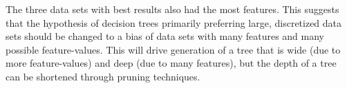 The three data sets with best results also had the most features.
This suggests that the hypothesis of decision trees primarily preferring large, discretized data sets should be changed to a bias of data sets with many features and many possible feature-values.
This will drive generation of a tree that is wide (due to more feature-values) and deep (due to many features), but the depth of a tree can be shortened through pruning techniques.

